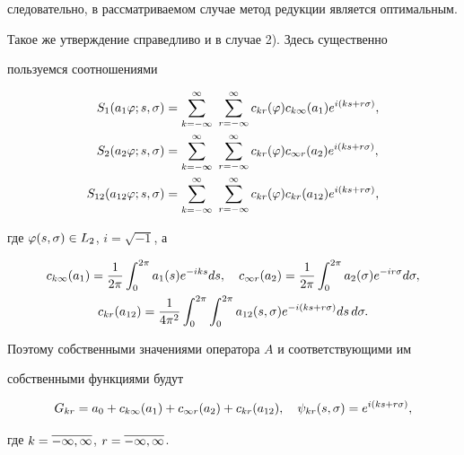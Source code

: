 следовательно, в рассматриваемом случае метод редукции является оптимальным. 





Такое же утверждение справедливо и в случае 2). Здесь существенно 


пользуемся соотношениями 


\begin{align*}


S_1(a_1\vp;s,\si) &= \sum_{k=-\infty}^\infty\ \sum_{r=-\infty}^\infty


c_{kr}(\vp) c_{k\infty}(a_1)e^{i(ks+r\si)},\\


%


S_2(a_2\vp;s,\si) &= \sum_{k=-\infty}^\infty\ \sum_{r=-\infty}^\infty


c_{kr}(\vp)c_{\infty r}(a_2)e^{i(ks+r\si)},\\


%


S_{12}(a_{12}\vp;s,\si) &= \sum_{k=-\infty}^\infty\ \sum_{r=-\infty}^\infty


c_{kr}(\vp)c_{kr}(a_{12})e^{i(ks+r\si)},


\end{align*}


где $\varphi(s,\sigma)\in L_2$, $i=\sqrt{-1}$, а 


\begin{gather*}


c_{k\infty}(a_1) = \frac{1}{2\pi}\int_{0}^{2\pi}a_1(s)e^{-iks}ds,\quad 


c_{\infty r}(a_2) = \frac{1}{2\pi}\int_{0}^{2\pi}a_2(\si)e^{-ir\si}d\si,\\


%


c_{kr}(a_{12}) = \frac{1}{4\pi^2}\int_{0}^{2\pi}\int_0^{2\pi}


a_{12}(s,\si)e^{-i(ks+r\si)}ds\,d\si.


\end{gather*}


Поэтому собственными значениями оператора $A$ и соответствующими им 


собственными функциями будут 


$$


G_{kr} = a_0 + c_{k\infty}(a_1) + c_{\infty r}(a_2) + c_{kr}(a_{12}),\quad 


\psi_{kr}(s,\si)=e^{i(ks+r\si)},


$$


где $k=\overline{-\infty,\infty}$, $r = \overline{-\infty,\infty}$.





